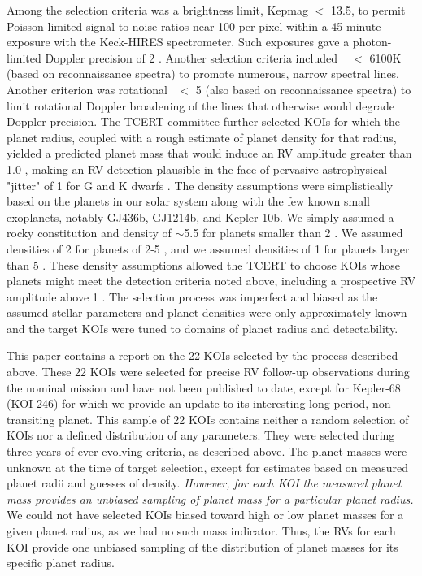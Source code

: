 \documentclass{emulateapj}
\begin{document}
Among the selection criteria was a brightness limit, Kepmag $<$ 13.5,
 to permit Poisson-limited signal-to-noise ratios near 100 per pixel
 within a 45 minute exposure with the Keck-HIRES spectrometer.  Such
 exposures gave a photon-limited Doppler precision of 2 \ms.  Another
 selection criteria included \teff~ $<$ 6100K (based on reconnaissance
 spectra) to promote numerous, narrow spectral lines.  Another criterion was
 rotational \vsini~$<$ 5 \kms (also based on reconnaissance spectra)
 to limit rotational Doppler broadening of the lines that otherwise
 would degrade Doppler precision.  The \ek TCERT committee further
 selected KOIs for which the planet radius, coupled with a rough
 estimate of planet density for that radius, yielded a predicted
 planet mass that would induce an RV amplitude greater than 1.0 \ms,
 making an RV detection plausible in the face of pervasive
 astrophysical "jitter" of 1 \ms for G and K dwarfs
 \citep{Isaacson2010}.  The density assumptions were simplistically
 based on the planets in our solar system along with the few known
 small exoplanets, notably GJ436b, GJ1214b, and Kepler-10b.  We simply
 assumed a rocky constitution and density of $\sim$5.5 \gcc for
 planets smaller than 2 \rearth.  We assumed densities of 2 \gcc for
 planets of 2-5 \rearth, and we assumed densities of 1 \gcc for
 planets larger than 5 \rearth.  These density assumptions allowed the
 \ek TCERT to choose KOIs whose planets might meet the detection
 criteria noted above, including a prospective RV amplitude above 1
 \ms.  The selection process was imperfect and biased as the assumed
 stellar parameters and planet densities were only approximately known
 and the target KOIs were tuned to domains of planet radius and
 detectability.

This paper contains a report on the 22 KOIs selected by the process
 described above.  These 22 KOIs were selected for precise RV
 follow-up observations during the nominal \ek mission and have not
 been published to date, except for Kepler-68 (KOI-246) for which we
 provide an update to its interesting long-period, non-transiting
 planet.  This sample of 22 KOIs contains neither a random selection
 of KOIs nor a defined distribution of any parameters.  They were
 selected during three years of ever-evolving criteria, as described
 above.  The planet masses were unknown at the time of target
 selection, except for estimates based on measured planet radii and
 guesses of density.  {\it However, for each KOI the measured planet
 mass provides an unbiased sampling of planet mass for a particular
 planet radius.}  We could not have selected KOIs biased toward high
 or low planet masses for a given planet radius, as we had no such
 mass indicator.  Thus, the RVs for each KOI provide one unbiased
 sampling of the distribution of planet masses for its specific planet
 radius.
\end{document}
